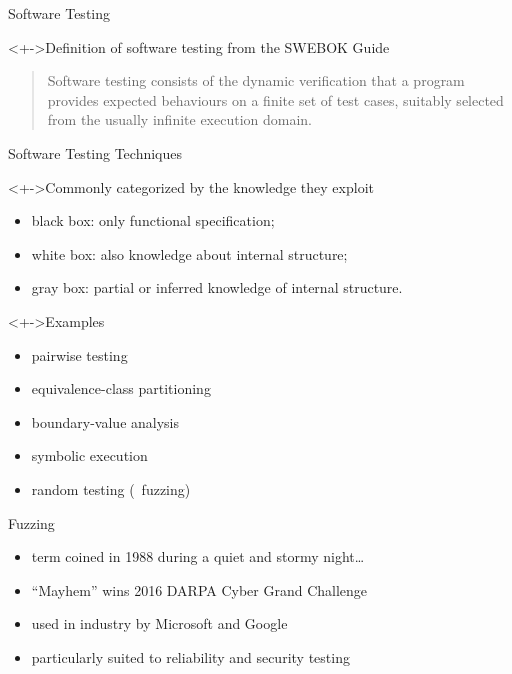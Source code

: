 \documentclass{beamer}
\begin{document}
\begin{frame}{Software Testing}
    \begin{block}<+->{Definition of software testing from the SWEBOK Guide}
        \begin{quote}
            Software testing consists of the \alert{dynamic} verification that a
            program provides \alert{expected} behaviours on a \alert{finite} set
            of test cases, suitably \alert{selected} from the usually infinite
            execution domain.
        \end{quote}
    \end{block}
\end{frame}

\begin{frame}{Software Testing Techniques}
    \begin{block}<+->{Commonly categorized by the knowledge they exploit}
        \begin{itemize}[<+->]
            \item{} black box: only functional specification;
            \item{} white box: also knowledge about internal structure;
            \item{} gray box: partial or inferred knowledge of internal structure.
        \end{itemize}
    \end{block}
    \begin{exampleblock}<+->{Examples}
        \begin{itemize}[<+->]
            \item{} pairwise testing
            \item{} equivalence-class partitioning
            \item{} boundary-value analysis
            \item{} symbolic execution
            \item{} random testing (\ie~\alert{fuzzing})
        \end{itemize}
    \end{exampleblock}
\end{frame}

\begin{frame}{Fuzzing}
    \begin{itemize}[<+->]
        \item{} term coined in 1988 during a quiet and stormy night\ldots\
        \item{} ``Mayhem'' wins 2016 DARPA Cyber Grand Challenge
        \item{} used in industry by Microsoft and Google
        \item{} particularly suited to reliability and security testing
    \end{itemize}
\end{frame}
\end{document}
